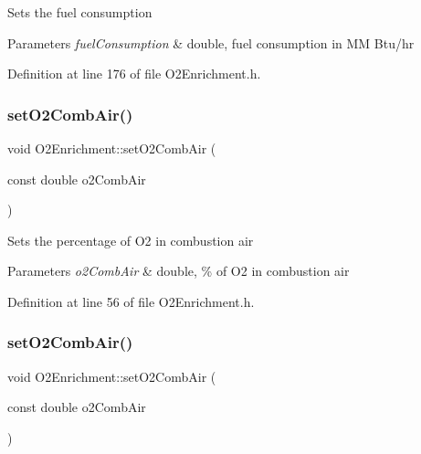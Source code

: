 Sets the fuel consumption 
\begin{DoxyParams}{Parameters}
{\em fuel\+Consumption} & double, fuel consumption in MM Btu/hr \\
\hline
\end{DoxyParams}


Definition at line 176 of file O2\+Enrichment.\+h.

\mbox{\label{class_o2_enrichment_a4ed21239c9e2ed2b193c94e9df0a9079}} 
\subsubsection{\texorpdfstring{set\+O2\+Comb\+Air()}{setO2CombAir()}\hspace{0.1cm}{\footnotesize\ttfamily [1/3]}}
{\footnotesize\ttfamily void O2\+Enrichment\+::set\+O2\+Comb\+Air (\begin{DoxyParamCaption}\item[{const double}]{o2\+Comb\+Air }\end{DoxyParamCaption})\hspace{0.3cm}{\ttfamily [inline]}}

Sets the percentage of O2 in combustion air 
\begin{DoxyParams}{Parameters}
{\em o2\+Comb\+Air} & double, \% of O2 in combustion air \\
\hline
\end{DoxyParams}


Definition at line 56 of file O2\+Enrichment.\+h.

\mbox{\label{class_o2_enrichment_a4ed21239c9e2ed2b193c94e9df0a9079}} 
\subsubsection{\texorpdfstring{set\+O2\+Comb\+Air()}{setO2CombAir()}\hspace{0.1cm}{\footnotesize\ttfamily [2/3]}}
{\footnotesize\ttfamily void O2\+Enrichment\+::set\+O2\+Comb\+Air (\begin{DoxyParamCaption}\item[{const double}]{o2\+Comb\+Air }\end{DoxyParamCaption})\hspace{0.3cm}{\ttfamily [inline]}}

